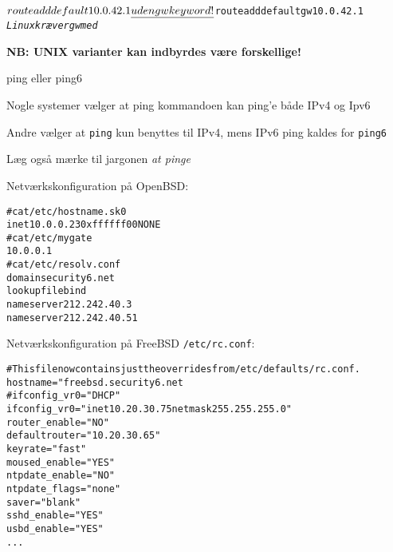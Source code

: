 
\begin{alltt}
$ route add default 10.0.42.1
\emph{uden gw keyword!}

$ route add default gw 10.0.42.1 
\emph{Linux kræver gw med}
\end{alltt}

\vskip 1cm

\centerline{\bf NB: UNIX varianter kan indbyrdes være forskellige!}




\vskip 1cm 
\centerline{ping eller ping6}

\begin{list1}
\item Nogle systemer vælger at ping kommandoen kan ping'e både IPv4 og Ipv6
\item Andre vælger at \verb+ping+ kun benyttes til IPv4, mens IPv6 ping kaldes for \verb+ping6+
\item Læg også mærke til jargonen \emph{at pinge}
\end{list1}



Netværkskonfiguration på OpenBSD:
\begin{alltt}
# cat /etc/hostname.sk0
inet 10.0.0.23 0xffffff00 NONE
# cat /etc/mygate
10.0.0.1
# cat /etc/resolv.conf    
domain security6.net
lookup file bind
nameserver 212.242.40.3
nameserver 212.242.40.51
\end{alltt}


Netværkskonfiguration på FreeBSD \verb+/etc/rc.conf+:
\begin{alltt}
\small
# This file now contains just the overrides from /etc/defaults/rc.conf.
hostname="freebsd.security6.net
#ifconfig_vr0="DHCP"
ifconfig_vr0="inet 10.20.30.75 netmask 255.255.255.0"
router_enable="NO"
defaultrouter="10.20.30.65"
keyrate="fast"
moused_enable="YES"
ntpdate_enable="NO"
ntpdate_flags="none"
saver="blank"
sshd_enable="YES"
usbd_enable="YES"
...
\end{alltt}






